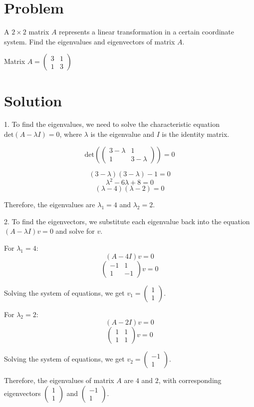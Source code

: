 \documentclass{article}
\begin{document}
\section*{Problem}
A $2\times2$ matrix $A$ represents a linear transformation in a certain coordinate system. Find the eigenvalues and eigenvectors of matrix $A$.

Matrix $A = \begin{pmatrix}
3 & 1 \\
1 & 3
\end{pmatrix}$

\section*{Solution}
1. To find the eigenvalues, we need to solve the characteristic equation $\text{det}(A - \lambda I) = 0$, where $\lambda$ is the eigenvalue and $I$ is the identity matrix.

\[
\text{det}\left(\begin{pmatrix}
3-\lambda & 1 \\
1 & 3-\lambda
\end{pmatrix}\right) = 0
\]

\[
(3-\lambda)(3-\lambda) - 1 = 0
\]
\[
\lambda^2 - 6\lambda + 8 = 0
\]
\[
(\lambda-4)(\lambda-2) = 0
\]

Therefore, the eigenvalues are $\lambda_1 = 4$ and $\lambda_2 = 2$.

2. To find the eigenvectors, we substitute each eigenvalue back into the equation $(A - \lambda I)v = 0$ and solve for $v$.

For $\lambda_1 = 4$:
\[
(A - 4I)v = 0
\]
\[
\begin{pmatrix}
-1 & 1 \\
1 & -1
\end{pmatrix}v = 0
\]

Solving the system of equations, we get $v_1 = \begin{pmatrix} 1 \\ 1 \end{pmatrix}$.

For $\lambda_2 = 2$:
\[
(A - 2I)v = 0
\]
\[
\begin{pmatrix}
1 & 1 \\
1 & 1
\end{pmatrix}v = 0
\]

Solving the system of equations, we get $v_2 = \begin{pmatrix} -1 \\ 1 \end{pmatrix}$.

Therefore, the eigenvalues of matrix $A$ are $4$ and $2$, with corresponding eigenvectors $\begin{pmatrix} 1 \\ 1 \end{pmatrix}$ and $\begin{pmatrix} -1 \\ 1 \end{pmatrix}$.
\end{document}
